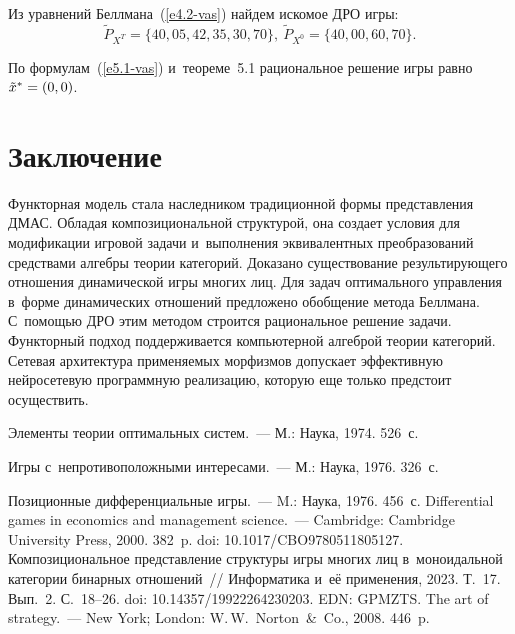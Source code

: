\begin{multicols}{2}
\vspace*{-4pt}

\noindent
Из уравнений Беллмана~(\ref{e4.2-vas}) найдем искомое ДРО игры:
$$
\tilde{P}_{X^T} =\{ 40, 05, 42, 35, 30, 70\},\ \tilde{P}_{X^0} = \{40, 00, 60, 70\}.
$$

\vspace*{-3pt}

\noindent
По формулам~(\ref{e5.1-vas}) и~тео\-ре\-ме~5.1 рациональное решение игры равно 
$\tilde{x}^*\hm=(0,0)$.

\vspace*{-12pt}

\section{Заключение}

\vspace*{-4pt}

    Функторная модель стала наследником традиционной формы представления 
ДМАС. Обладая композициональной структурой, она создает условия для 
модификации игровой задачи и~выполнения эквивалентных преобразований 
средствами алгебры тео\-рии категорий. Доказано существование ре\-зуль\-ти\-ру\-юще\-го 
отношения динамической игры многих лиц. Для задач оптимального управ\-ле\-ния 
в~форме динамических отношений предложено обобщение метода Беллмана.  
С~по\-мощью ДРО этим методом строится рациональное решение задачи. 
Функторный подход поддерживается компьютерной алгеброй тео\-рии категорий. 
Сетевая архитектура применяемых морфизмов допускает эффективную 
нейросетевую программную реализацию, которую еще только пред\-сто\-ит 
осуществить. 

\vspace*{-12pt}

{\small\frenchspacing
 {\baselineskip=10.6pt
 \begin{thebibliography}{99}
 
\vspace*{-3pt}

 Элементы теории оптимальных сис\-тем.~--- М.: Наука, 1974. 526~с.

 Игры с~непротивоположными интересами.~--- М.: Наука, 1976. 326~с.

 Позиционные дифференциальные игры.~--- M.: Наука, 
1976. 456~с.
 Differential games in economics and management
science.~--- Cambridge: Cambridge University 
Press, 2000. 382~p. doi: 10.1017/CBO9780511805127.
 Композициональное представление структуры игры многих лиц 
в~моноидальной категории бинарных отношений~// Информатика и~её применения, 2023. Т.~17. 
Вып.~2. С.~18--26. doi: 10.14357/19922264230203. EDN: GPMZTS.
 The art of strategy.~--- New York; London: W.\,W.~Norton~\&~Co., 
2008. 446~p.


\end{thebibliography}}}
\end{multicols}

